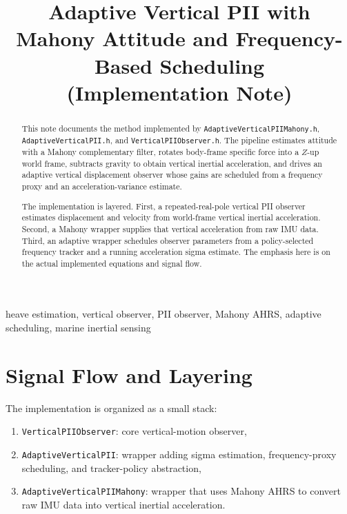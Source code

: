 \documentclass[conference]{IEEEtran}
\title{Adaptive Vertical PII with Mahony Attitude and Frequency-Based Scheduling\\
(Implementation Note)}
\author{%
  \IEEEauthorblockN{Mikhail S.\ Grushinskiy}
  \IEEEauthorblockA{Bareboat Necessities Project\\
  \texttt{mgrouch@users.github.com}}
}
\begin{document}
\maketitle

\begin{abstract}
This note documents the method implemented by
\texttt{AdaptiveVerticalPIIMahony.h},
\texttt{AdaptiveVerticalPII.h}, and
\texttt{VerticalPIIObserver.h}.
The pipeline estimates attitude with a Mahony complementary filter,
rotates body-frame specific force into a \(Z\)-up world frame,
subtracts gravity to obtain vertical inertial acceleration,
and drives an adaptive vertical displacement observer whose gains are
scheduled from a frequency proxy and an acceleration-variance estimate.

The implementation is layered.
First, a repeated-real-pole vertical PII observer estimates
displacement and velocity from world-frame vertical inertial acceleration.
Second, a Mahony wrapper supplies that vertical acceleration from raw IMU data.
Third, an adaptive wrapper schedules observer parameters from a policy-selected
frequency tracker and a running acceleration sigma estimate.
The emphasis here is on the actual implemented equations and signal flow.
\end{abstract}

\begin{IEEEkeywords}
heave estimation, vertical observer, PII observer, Mahony AHRS,
adaptive scheduling, marine inertial sensing
\end{IEEEkeywords}

\section{Signal Flow and Layering}

The implementation is organized as a small stack:
\begin{enumerate}[leftmargin=1.5em]
  \item \texttt{VerticalPIIObserver}: core vertical-motion observer,
  \item \texttt{AdaptiveVerticalPII}: wrapper adding sigma estimation,
        frequency-proxy scheduling, and tracker-policy abstraction,
  \item \texttt{AdaptiveVerticalPIIMahony}: wrapper that uses Mahony AHRS
        to convert raw IMU data into vertical inertial acceleration.
\end{enumerate}
\end{document}
